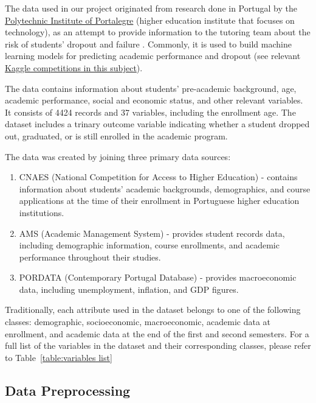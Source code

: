 \documentclass{article}
\begin{document}
The data used in our project originated from research done in Portugal by the \href{https://www.ipportalegre.pt/pt/}{Polytechnic Institute of Portalegre} (higher education institute that focuses on technology), as an attempt to provide information to the tutoring team about the risk of students' dropout and failure \citep{data7110146}. Commonly, it is used to build machine learning models for predicting academic performance and dropout (see relevant \href{https://www.kaggle.com/datasets/ankanhore545/dropout-or-academic-success/data}{Kaggle competitions in this subject}).

The data contains information about students' pre-academic background, age, academic performance, social and economic status, and other relevant variables. It consists of 4424 records and 37 variables, including the enrollment age. The dataset includes a trinary outcome variable indicating whether a student dropped out, graduated, or is still enrolled in the academic program. 

The data was created by joining three primary data sources: 
\begin{enumerate}
    \item CNAES (National Competition for Access to Higher Education) - contains information about students' academic backgrounds, demographics, and course applications at the time of their enrollment in Portuguese higher education institutions.
    \item AMS (Academic Management System) - provides student records data, including demographic information, course enrollments, and academic performance throughout their studies.
    \item PORDATA (Contemporary Portugal Database) - provides macroeconomic data, including unemployment, inflation, and GDP figures.
\end{enumerate}

Traditionally, each attribute used in the dataset belongs to one of the following classes: demographic,
socioeconomic, macroeconomic, academic data at enrollment, and academic data at the end of the first and second semesters. For a full list of the variables in the dataset and their corresponding classes, please refer to Table~\ref{table:variables list}

\subsection{Data Preprocessing}
\end{document}
